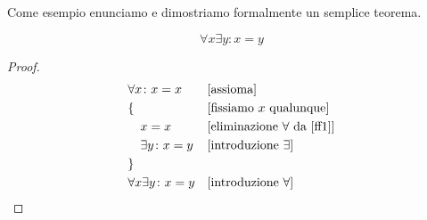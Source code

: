 Come esempio enunciamo e dimostriamo formalmente un semplice 
teorema.

\begin{theorem}
  \[ \forall x \exists y\colon x=y \]
\end{theorem}
\begin{proof}
  \begin{align}
    &\forall x\colon x = x & & \text{[assioma]} \label{ff1}\\
    &\{ & &\text{[fissiamo $x$ qualunque]}\\
    &\quad x=x  & & \text{[eliminazione $\forall$ da \eqref{ff1}]}\\ 
    &\quad \exists y\colon x=y & &\text{[introduzione $\exists$]}\\
    &\} & &\\
    &\forall x\exists y\colon x=y & &\text{[introduzione $\forall$]} 
  \end{align}
\end{proof}

